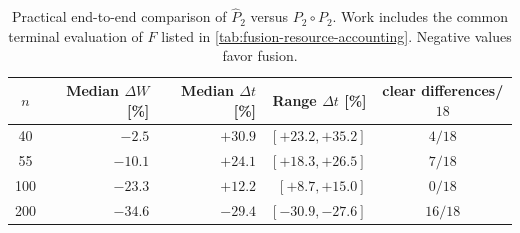 \begin{table}[htbp]
\centering
\small
\caption{Practical end-to-end comparison of $\widehat P_2$ versus $P_2\circ P_2$. Work includes the common terminal evaluation of $F$ listed in \cref{tab:fusion-resource-accounting}. Negative values favor fusion.}
\label{tab:fusion-practical}
\begin{tabular}{crrrc}
\toprule
$n$ & Median $\Delta W$ [\%] & Median $\Delta t$ [\%] & Range $\Delta t$ [\%] & clear differences/$18$\\
\midrule
40  & $-2.5$  & $+30.9$ & $[+23.2,+35.2]$ & $4/18$\\
55  & $-10.1$ & $+24.1$ & $[+18.3,+26.5]$ & $7/18$\\
100 & $-23.3$ & $+12.2$ & $[+8.7,+15.0]$  & $0/18$\\
200 & $-34.6$ & $-29.4$ & $[-30.9,-27.6]$ & $16/18$\\
\bottomrule
\end{tabular}
\end{table}
